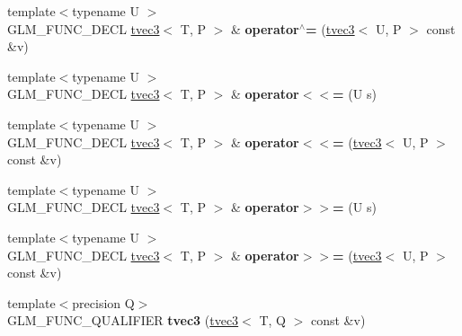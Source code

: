 \begin{DoxyCompactItemize}
\item 
{\footnotesize template$<$typename U $>$ }\\G\+L\+M\+\_\+\+F\+U\+N\+C\+\_\+\+D\+E\+CL \hyperlink{structglm_1_1detail_1_1tvec3}{tvec3}$<$ T, P $>$ \& {\bfseries operator$^\wedge$=} (\hyperlink{structglm_1_1detail_1_1tvec3}{tvec3}$<$ U, P $>$ const \&v)\hypertarget{structglm_1_1detail_1_1tvec3_ad71ff1bf45dbb9470b34b55c9a8cd951}{}\label{structglm_1_1detail_1_1tvec3_ad71ff1bf45dbb9470b34b55c9a8cd951}

\item 
{\footnotesize template$<$typename U $>$ }\\G\+L\+M\+\_\+\+F\+U\+N\+C\+\_\+\+D\+E\+CL \hyperlink{structglm_1_1detail_1_1tvec3}{tvec3}$<$ T, P $>$ \& {\bfseries operator$<$$<$=} (U s)\hypertarget{structglm_1_1detail_1_1tvec3_a9a985982567897cff02307730e4ae5a1}{}\label{structglm_1_1detail_1_1tvec3_a9a985982567897cff02307730e4ae5a1}

\item 
{\footnotesize template$<$typename U $>$ }\\G\+L\+M\+\_\+\+F\+U\+N\+C\+\_\+\+D\+E\+CL \hyperlink{structglm_1_1detail_1_1tvec3}{tvec3}$<$ T, P $>$ \& {\bfseries operator$<$$<$=} (\hyperlink{structglm_1_1detail_1_1tvec3}{tvec3}$<$ U, P $>$ const \&v)\hypertarget{structglm_1_1detail_1_1tvec3_a93c05e5b5b1a09319f62d30dac259516}{}\label{structglm_1_1detail_1_1tvec3_a93c05e5b5b1a09319f62d30dac259516}

\item 
{\footnotesize template$<$typename U $>$ }\\G\+L\+M\+\_\+\+F\+U\+N\+C\+\_\+\+D\+E\+CL \hyperlink{structglm_1_1detail_1_1tvec3}{tvec3}$<$ T, P $>$ \& {\bfseries operator$>$$>$=} (U s)\hypertarget{structglm_1_1detail_1_1tvec3_aaf71601d2b5d3be4eb778f1f3871a551}{}\label{structglm_1_1detail_1_1tvec3_aaf71601d2b5d3be4eb778f1f3871a551}

\item 
{\footnotesize template$<$typename U $>$ }\\G\+L\+M\+\_\+\+F\+U\+N\+C\+\_\+\+D\+E\+CL \hyperlink{structglm_1_1detail_1_1tvec3}{tvec3}$<$ T, P $>$ \& {\bfseries operator$>$$>$=} (\hyperlink{structglm_1_1detail_1_1tvec3}{tvec3}$<$ U, P $>$ const \&v)\hypertarget{structglm_1_1detail_1_1tvec3_a4b3fa6e8ad7b60b8bd7d87e9918bb9fc}{}\label{structglm_1_1detail_1_1tvec3_a4b3fa6e8ad7b60b8bd7d87e9918bb9fc}

\item 
{\footnotesize template$<$precision Q$>$ }\\G\+L\+M\+\_\+\+F\+U\+N\+C\+\_\+\+Q\+U\+A\+L\+I\+F\+I\+ER {\bfseries tvec3} (\hyperlink{structglm_1_1detail_1_1tvec3}{tvec3}$<$ T, Q $>$ const \&v)\hypertarget{structglm_1_1detail_1_1tvec3_a24728ecfb1a04a02cf53f27e4a536395}{}\label{structglm_1_1detail_1_1tvec3_a24728ecfb1a04a02cf53f27e4a536395}


\end{DoxyCompactItemize}
